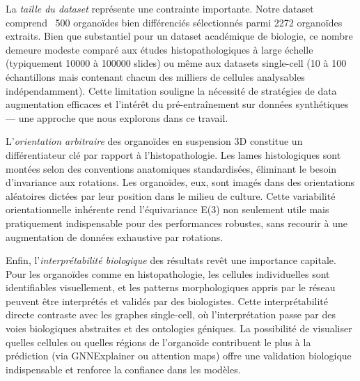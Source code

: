 La \textit{taille du dataset} représente une contrainte importante. Notre dataset comprend ~500 organoïdes bien différenciés sélectionnés parmi 2272 organoïdes extraits. Bien que substantiel pour un dataset académique de biologie, ce nombre demeure modeste comparé aux études histopathologiques à large échelle (typiquement 10000 à 100000 slides) ou même aux datasets single-cell (10 à 100 échantillons mais contenant chacun des milliers de cellules analysables indépendamment). Cette limitation souligne la nécessité de stratégies de data augmentation efficaces et l'intérêt du pré-entraînement sur données synthétiques — une approche que nous explorons dans ce travail.

L'\textit{orientation arbitraire} des organoïdes en suspension 3D constitue un différentiateur clé par rapport à l'histopathologie. Les lames histologiques sont montées selon des conventions anatomiques standardisées, éliminant le besoin d'invariance aux rotations. Les organoïdes, eux, sont imagés dans des orientations aléatoires dictées par leur position dans le milieu de culture. Cette variabilité orientationnelle inhérente rend l'équivariance E(3) non seulement utile mais pratiquement indispensable pour des performances robustes, sans recourir à une augmentation de données exhaustive par rotations.

Enfin, l'\textit{interprétabilité biologique} des résultats revêt une importance capitale. Pour les organoïdes comme en histopathologie, les cellules individuelles sont identifiables visuellement, et les patterns morphologiques appris par le réseau peuvent être interprétés et validés par des biologistes. Cette interprétabilité directe contraste avec les graphes single-cell, où l'interprétation passe par des voies biologiques abstraites et des ontologies géniques. La possibilité de visualiser quelles cellules ou quelles régions de l'organoïde contribuent le plus à la prédiction (via GNNExplainer ou attention maps) offre une validation biologique indispensable et renforce la confiance dans les modèles.